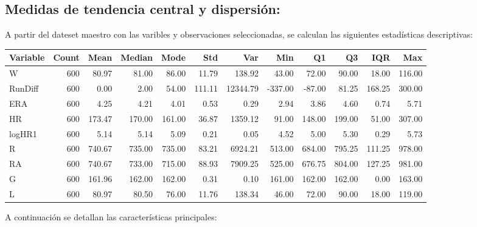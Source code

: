 \documentclass[10pt]{article}
\begin{document}
\subsection{Medidas de tendencia central y dispersión:}
A partir del dateset maestro con las varibles y observaciones seleccionadas, se calculan las siguientes estadísticas descriptivas:
\begin{table}[H]
    \centering
    \begin{tabular}{lrrrrrrrrrrr}
        \hline
            Variable & Count & Mean & Median & Mode & Std & Var & Min & Q1 & Q3 & IQR & Max \\
        \hline
            W       & 600 & 80.97 & 81.00 & 86.00 & 11.79 & 138.92 & 43.00 & 72.00 & 90.00 & 18.00 & 116.00 \\
            RunDiff & 600 & 0.00  & 2.00  & 54.00 & 111.11 & 12344.79 & -337.00 & -87.00 & 81.25 & 168.25 & 300.00 \\
            ERA     & 600 & 4.25  & 4.21  & 4.01  & 0.53  & 0.29 & 2.94 & 3.86 & 4.60 & 0.74 & 5.71 \\
            HR      & 600 & 173.47 & 170.00 & 161.00 & 36.87 & 1359.12 & 91.00 & 148.00 & 199.00 & 51.00 & 307.00 \\
            logHR1  & 600 & 5.14  & 5.14  & 5.09  & 0.21  & 0.05 & 4.52 & 5.00 & 5.30 & 0.29 & 5.73 \\
            R       & 600 & 740.67 & 735.00 & 735.00 & 83.21 & 6924.21 & 513.00 & 684.00 & 795.25 & 111.25 & 978.00 \\
            RA      & 600 & 740.67 & 733.00 & 715.00 & 88.93 & 7909.25 & 525.00 & 676.75 & 804.00 & 127.25 & 981.00 \\
            G       & 600 & 161.96 & 162.00 & 162.00 & 0.31 & 0.10 & 161.00 & 162.00 & 162.00 & 0.00 & 163.00 \\
            L       & 600 & 80.97 & 80.50 & 76.00 & 11.76 & 138.34 & 46.00 & 72.00 & 90.00 & 18.00 & 119.00 \\
        \hline
    \end{tabular}
\end{table}

A continuación se detallan las características principales:
\end{document}
